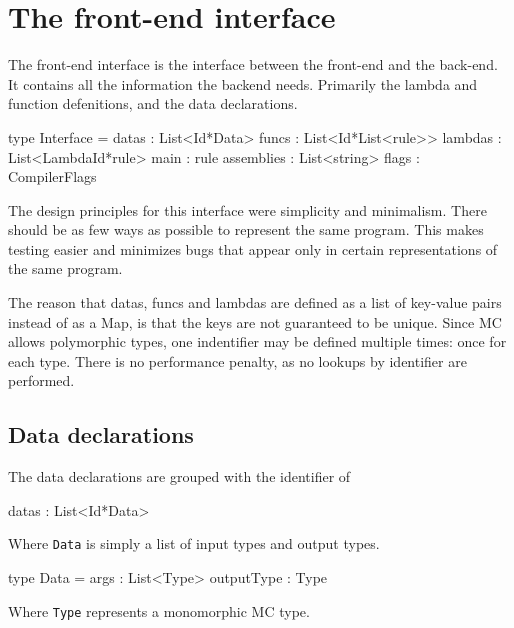 \section{The front-end interface}
The front-end interface is the interface between the front-end and the back-end.
It contains all the information the backend needs.
Primarily the lambda and function defenitions, and the data declarations.

\begin{code}
type Interface = {
  datas      : List<Id*Data>
  funcs      : List<Id*List<rule>>
  lambdas    : List<LambdaId*rule>
  main       : rule
  assemblies : List<string> 
  flags      : CompilerFlags
}
\end{code}

The design principles for this interface were simplicity and minimalism.
There should be as few ways as possible to represent the same program.
This makes testing easier and minimizes bugs that appear only in certain representations of the same program.

The reason that datas, funcs and lambdas are defined as a list of key-value pairs instead of as a Map, is that the keys are not guaranteed to be unique.
Since MC allows polymorphic types, one indentifier may be defined multiple times: once for each type.
There is no performance penalty, as no lookups by identifier are performed.

\subsection{Data declarations}
The data declarations are grouped with the identifier of 

\begin{code}
datas : List<Id*Data>
\end{code}

Where \verb|Data| is simply a list of input types and output types.

\begin{code}
type Data = {
  args       : List<Type>
  outputType : Type
}
\end{code}

Where \verb|Type| represents a monomorphic MC type.


